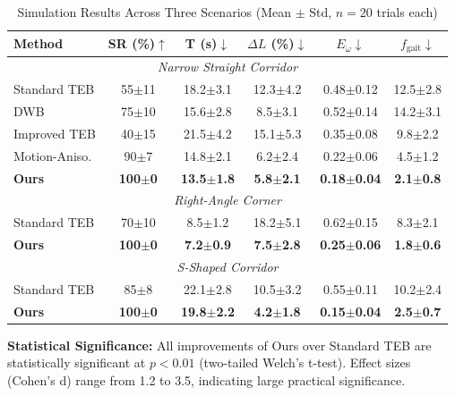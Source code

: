 \documentclass[lettersize,journal]{IEEEtran}
\begin{document}
\begin{table}[htbp]
\centering
\caption{Simulation Results Across Three Scenarios (Mean $\pm$ Std, $n=20$ trials each)}
\label{tab:simulation_results}
\begin{tabular}{l|ccc|cc}
\hline
\textbf{Method} & \textbf{SR (\%)}$\uparrow$ & \textbf{T (s)}$\downarrow$ & \textbf{$\Delta L$ (\%)}$\downarrow$ & \textbf{$E_{\dot{\omega}}$}$\downarrow$ & \textbf{$f_{\text{gait}}$}$\downarrow$ \\
\hline
\multicolumn{6}{c}{\textit{Narrow Straight Corridor}} \\
\hline
Standard TEB & 55$\pm$11 & 18.2$\pm$3.1 & 12.3$\pm$4.2 & 0.48$\pm$0.12 & 12.5$\pm$2.8 \\
DWB & 75$\pm$10 & 15.6$\pm$2.8 & 8.5$\pm$3.1 & 0.52$\pm$0.14 & 14.2$\pm$3.1 \\
Improved TEB & 40$\pm$15 & 21.5$\pm$4.2 & 15.1$\pm$5.3 & 0.35$\pm$0.08 & 9.8$\pm$2.2 \\
Motion-Aniso. & 90$\pm$7 & 14.8$\pm$2.1 & 6.2$\pm$2.4 & 0.22$\pm$0.06 & 4.5$\pm$1.2 \\
\textbf{Ours} & \textbf{100$\pm$0} & \textbf{13.5$\pm$1.8} & \textbf{5.8$\pm$2.1} & \textbf{0.18$\pm$0.04} & \textbf{2.1$\pm$0.8} \\
\hline
\multicolumn{6}{c}{\textit{Right-Angle Corner}} \\
\hline
Standard TEB & 70$\pm$10 & 8.5$\pm$1.2 & 18.2$\pm$5.1 & 0.62$\pm$0.15 & 8.3$\pm$2.1 \\
\textbf{Ours} & \textbf{100$\pm$0} & \textbf{7.2$\pm$0.9} & \textbf{7.5$\pm$2.8} & \textbf{0.25$\pm$0.06} & \textbf{1.8$\pm$0.6} \\
\hline
\multicolumn{6}{c}{\textit{S-Shaped Corridor}} \\
\hline
Standard TEB & 85$\pm$8 & 22.1$\pm$2.8 & 10.5$\pm$3.2 & 0.55$\pm$0.11 & 10.2$\pm$2.4 \\
\textbf{Ours} & \textbf{100$\pm$0} & \textbf{19.8$\pm$2.2} & \textbf{4.2$\pm$1.8} & \textbf{0.15$\pm$0.04} & \textbf{2.5$\pm$0.7} \\
\hline
\end{tabular}
\end{table}

\textbf{Statistical Significance:} All improvements of Ours over Standard TEB are statistically significant at $p < 0.01$ (two-tailed Welch's t-test). Effect sizes (Cohen's d) range from 1.2 to 3.5, indicating large practical significance.
\end{document}
